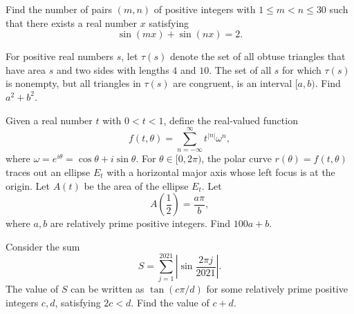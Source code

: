 \begin{question}[name={2021 AIME I, \href{https://artofproblemsolving.com/community/c4p20872572}{Problem 7}}]
	Find the number of pairs $(m,n)$ of positive integers with $1\le m<n\le 30$ such that there exists a real number $x$ satisfying $$\sin(mx)+\sin(nx)=2.$$
\end{question}


%	


















\begin{question}[name={2021 AIME II, \href{https://artofproblemsolving.com/community/c4p21026709}{Problem 5}}]
	For positive real numbers $s$, let $\tau(s)$ denote the set of all obtuse triangles that have area $s$ and two sides with lengths $4$ and $10$. The set of all $s$ for which $\tau(s)$ is nonempty, but all triangles in $\tau(s)$ are congruent, is an interval $[a,b)$. Find $a^2+b^2$.
\end{question}


%	


\begin{question}[name={2021 PUMaC, Team Round, \href{https://artofproblemsolving.com/community/c4p24986107}{Problem 5}}]
	Given a real number $t$ with $0 < t < 1$, define the real-valued function $$f(t, \theta) = \sum^{\infty}_{n=-\infty} t^{|n|}\omega^n,$$ where $\omega = e^{i \theta} = \cos  \theta + i\sin  \theta$. For $\theta \in [0, 2\pi)$, the polar curve $r(\theta) = f(t, \theta)$ traces out an ellipse $E_t$ with a horizontal major axis whose left focus is at the origin. Let $A(t)$ be the area of the ellipse $E_t$. Let $$A\left( \frac12 \right) = \frac{a\pi}{b},$$ where $a, b$ are relatively prime positive integers. Find $100a +b$.
\end{question}






\begin{question}[name={2021 PUMaC, Algebra, \href{https://artofproblemsolving.com/community/c4p25094276}{Problem 5}}]
	Consider the sum$$S =\sum^{2021}_{j=1} \left|\sin \frac{2\pi j}{2021}\right|.$$The value of $S$ can be written as $\tan \left( {c\pi}/{d} \right)$ for some relatively prime positive integers $c, d$, satisfying $2c < d$. Find the value of $c + d$.
\end{question}










